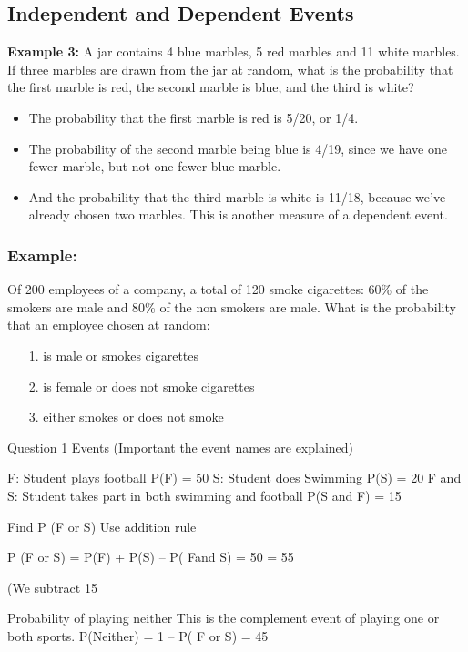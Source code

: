 \documentclass[]{report}
\begin{document}
\subsection{Independent and Dependent Events}

\textbf{Example 3:} A jar contains 4 blue marbles, 5 red marbles and 11 white marbles. If three marbles are drawn from the jar at random, what is the probability that the first marble is red, the second marble is blue, and the third is white?
\begin{itemize}
	\item The probability that the first marble is red is 5/20, or 1/4. 
	\item The probability of the second marble being blue is 4/19, since we have one fewer marble, but not one fewer blue marble. 
	\item And the probability that the third marble is white is 11/18, because we've already chosen two marbles. This is another measure of a dependent event.
\end{itemize}
\subsubsection{Example:}
Of 200 employees of a company, a total of 120 smoke cigarettes:
60\% of the smokers are male and 80\% of the non smokers are
male. What is the probability that an employee chosen at random:
\begin{itemize}
	\item[1.]  is male or smokes cigarettes
	\item[2.] is female or does not smoke cigarettes
	\item[3.] either smokes or does not smoke
\end{itemize}




Question 1
Events  (Important the event names are explained)

F: 		Student plays football			P(F) = 50%
S: 		Student does Swimming		P(S) = 20%
F and S:            Student takes part in both swimming and football  
P(S and F) = 15%

Find P (F or S)
Use addition rule

P (F or S)  =  P(F) + P(S) – P( Fand S)
=  50%
=   55%

(We subtract 15%

Probability of playing neither
This is the complement event of playing one or both sports.
P(Neither) = 1 –  P( F or S)  = 45%
\end{document}
